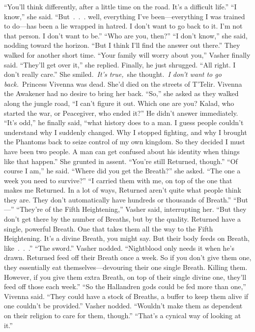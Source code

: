 “You’ll think differently, after a little time on the road. It’s a difficult life.”
“I know,” she said. “But~.~.~. well, everything I’ve been—everything I was trained to do—has been a lie wrapped in hatred. I don’t want to go back to it. I’m not that person. I don’t want to be.”
“Who are you, then?”
“I don’t know,” she said, nodding toward the horizon. “But I think I’ll find the answer out there.”
They walked for another short time.
“Your family will worry about you,” Vasher finally said.
“They’ll get over it,” she replied.
Finally, he just shrugged. “All right. I don’t really care.”
She smiled.~\textit{It’s true,}~she thought.~\textit{I don’t want to go back.}~Princess Vivenna was dead. She’d died on the streets of T’Telir. Vivenna the Awakener had no desire to bring her back.
“So,” she asked as they walked along the jungle road, “I can’t figure it out. Which one are you? Kalad, who started the war, or Peacegiver, who ended it?”
He didn’t answer immediately. “It’s odd,” he finally said, “what history does to a man. I guess people couldn’t understand why I suddenly changed. Why I stopped fighting, and why I brought the Phantoms back to seize control of my own kingdom. So they decided I must have been two people. A man can get confused about his identity when things like that happen.”
She grunted in assent. “You’re still Returned, though.”
“Of course I am,” he said.
“Where did you get the Breath?” she asked. “The one a week you need to survive?”
“I carried them with me, on top of the one that makes me Returned. In a lot of ways, Returned aren’t quite what people think they are. They don’t automatically have hundreds or thousands of Breath.”
“But—”
“They’re of the Fifth Heightening,” Vasher said, interrupting her. “But they don’t get there by the number of Breaths, but by the quality. Returned have a single, powerful Breath. One that takes them all the way to the Fifth Heightening. It’s a divine Breath, you might say. But their body feeds on Breath, like~.~.~.”
“The sword.”
Vasher nodded. “Nightblood only needs it when he’s drawn. Returned feed off their Breath once a week. So if you don’t give them one, they essentially eat themselves—devouring their one single Breath. Killing them. However, if you give them extra Breath, on top of their single divine one, they’ll feed off those each week.”
“So the Hallandren gods could be fed more than one,” Vivenna said. “They could have a stock of Breaths, a buffer to keep them alive if one couldn’t be provided.”
Vasher nodded. “Wouldn’t make them as dependent on their religion to care for them, though.”
“That’s a cynical way of looking at it.”
